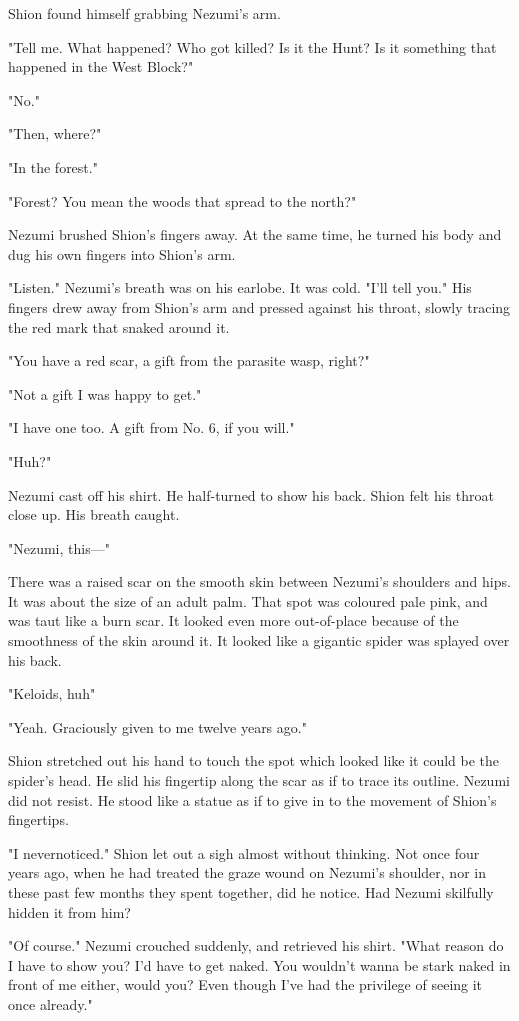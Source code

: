 Shion found himself grabbing Nezumi's arm.

"Tell me. What happened? Who got killed? Is it the Hunt? Is it something
that happened in the West Block?"

"No."

"Then, where?"

"In the forest."

"Forest? You mean the woods that spread to the north?"

Nezumi brushed Shion's fingers away. At the same time, he turned his
body and dug his own fingers into Shion's arm.

"Listen." Nezumi's breath was on his earlobe. It was cold. "I'll tell
you." His fingers drew away from Shion's arm and pressed against his
throat, slowly tracing the red mark that snaked around it.

"You have a red scar, a gift from the parasite wasp, right?"

"Not a gift I was happy to get."

"I have one too. A gift from No. 6, if you will."

"Huh?"

Nezumi cast off his shirt. He half-turned to show his back. Shion felt
his throat close up. His breath caught.

"Nezumi, this---"

There was a raised scar on the smooth skin between Nezumi's shoulders
and hips. It was about the size of an adult palm. That spot was coloured
pale pink, and was taut like a burn scar. It looked even more
out-of-place because of the smoothness of the skin around it. It looked
like a gigantic spider was splayed over his back.

"Keloids, huh\el "

"Yeah. Graciously given to me twelve years ago."

Shion stretched out his hand to touch the spot which looked like it
could be the spider's head. He slid his fingertip along the scar as if
to trace its outline. Nezumi did not resist. He stood like a statue as
if to give in to the movement of Shion's fingertips.

"I never\el noticed." Shion let out a sigh almost without thinking. Not
once four years ago, when he had treated the graze wound on Nezumi's
shoulder, nor in these past few months they spent together, did he
notice. Had Nezumi skilfully hidden it from him?

"Of course." Nezumi crouched suddenly, and retrieved his shirt. "What
reason do I have to show you? I'd have to get naked. You wouldn't wanna
be stark naked in front of me either, would you? Even though I've had
the privilege of seeing it once already."

